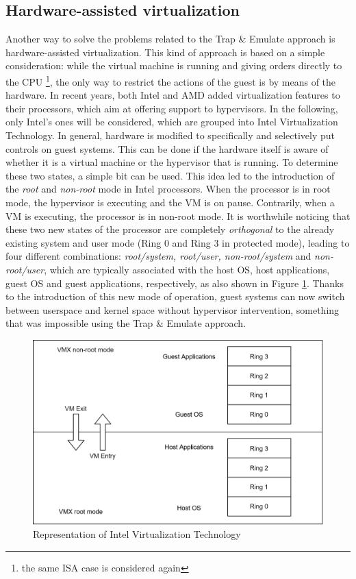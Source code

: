 \subsection{Hardware-assisted virtualization}
Another way to solve the problems related to the Trap \& Emulate approach is hardware-assisted virtualization. This kind of approach is based on a simple consideration: while the virtual machine is running and giving orders directly to the CPU \footnote{the same ISA case is considered again}, the only way to restrict the actions of the guest is by means of the hardware. In recent years, both Intel and AMD added virtualization features to their processors, which aim at offering support to hypervisors. In the following, only Intel's ones will be considered, which are grouped into Intel Virtualization Technology. In general, hardware is modified to specifically and selectively put controls on guest systems. This can be done if the hardware itself is aware of whether it is a virtual machine or the hypervisor that is running. To determine these two states, a simple bit can be used. This idea led to the introduction of the \emph{root} and \emph{non-root} mode in Intel processors. When the processor is in root mode, the hypervisor is executing and the VM is on pause. Contrarily, when a VM is executing, the processor is in non-root mode. It is worthwhile noticing that these two new states of the processor are completely \emph{orthogonal} to the already existing system and user mode (Ring 0 and Ring 3 in protected mode), leading to four different combinations: \emph{root/system, root/user, non-root/system} and \emph{non-root/user}, which are typically associated with the host OS, host applications, guest OS and guest applications, respectively, as also shown in Figure \ref{fig:intel-vt}. Thanks to the introduction of this new mode of operation, guest systems can now switch between userspace and kernel space without hypervisor intervention, something that was impossible using the Trap \& Emulate approach. 
\begin{figure}
    \centering
    \includegraphics{images/root-nonroot.png}
    \caption{Representation of Intel Virtualization Technology}
    \label{fig:intel-vt}
\end{figure}
